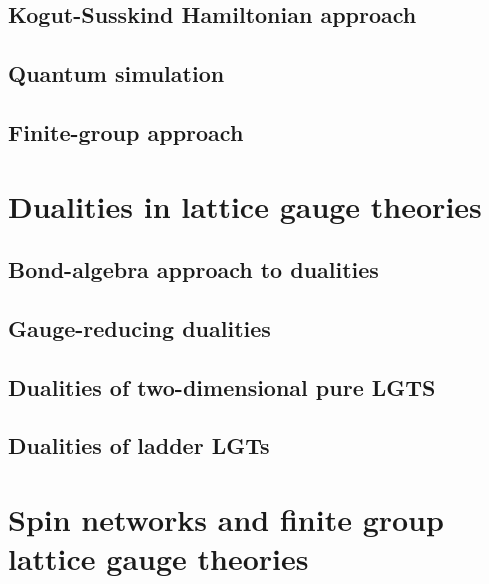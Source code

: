 \documentclass{book}
\begin{document}
\section{Kogut-Susskind Hamiltonian approach}
\label{sec:kogut_susskind_approach}


\section{Quantum simulation}
\label{sec:quantum_simulation}


\section{Finite-group approach}
\label{sec:finite_group_approach}




\chapter{Dualities in lattice gauge theories}
\label{chap:dualities_in_lattice_gauge_theories}

\section{Bond-algebra approach to dualities}
\label{sec:bond_algebra_approach_to_dualities}

\section{Gauge-reducing dualities}
\label{sec:gauge_reducing_dualities}

\section{Dualities of two-dimensional pure LGTS}
\label{sec:dualities_of_two_dimensional_pure_lgts}

\section{Dualities of ladder LGTs}
\label{sec:dualities_of_ladder_lgts}


\chapter{Spin networks and finite group lattice gauge theories}
\label{chap:spin_networks_and_finite_group_lattice_gauge_theories}
\end{document}
